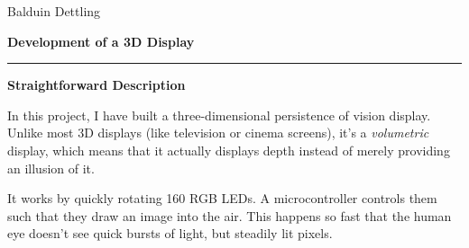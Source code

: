 \documentclass[a4paper, 11pt]{article}
\begin{document}
\hfill Balduin Dettling

\vspace{1cm}
\begin{center}

	{\huge\bfseries Development of a 3D Display\vspace{-2mm}}
	\rule{0.67\textwidth}{1.5pt}

	{\vspace{-2mm} \Large\bfseries Straightforward Description}

\end{center}

In this project, I have built a three-dimensional persistence of vision
display. Unlike most 3D displays (like television or cinema screens), it's a
\emph{volumetric} display, which means that it actually displays depth instead
of merely providing an illusion of it.

It works by quickly rotating 160 RGB LEDs. A microcontroller controls them such
that they draw an image into the air. This happens so fast that the human eye
doesn't see quick bursts of light, but steadily lit pixels.
\end{document}
